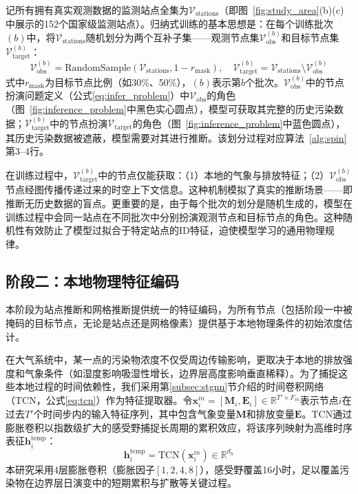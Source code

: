 记所有拥有真实观测数据的监测站点全集为$\mathcal{V}_{\text{stations}}$（即图~\ref{fig:study_area}(b)(c)中展示的152个国家级监测站点）。归纳式训练的基本思想是：在每个训练批次$(b)$中，将$\mathcal{V}_{\text{stations}}$随机划分为两个互补子集——观测节点集$\mathcal{V}_{\text{obs}}^{(b)}$和目标节点集$\mathcal{V}_{\text{target}}^{(b)}$：
\begin{equation}
\mathcal{V}_{\text{obs}}^{(b)} = \text{RandomSample}(\mathcal{V}_{\text{stations}}, 1 - r_{\text{mask}}), \quad \mathcal{V}_{\text{target}}^{(b)} = \mathcal{V}_{\text{stations}} \setminus \mathcal{V}_{\text{obs}}^{(b)}
\label{eq:inductive_sampling}
\end{equation}
\noindent 式中$r_{\text{mask}}$为目标节点比例（如30\%、50\%），$(b)$表示第$b$个批次。$\mathcal{V}_{\text{obs}}^{(b)}$中的节点扮演问题定义（公式\eqref{eq:infer_problem}）中$\mathcal{V}_{\text{obs}}$的角色（图~\ref{fig:inference_problem}中黑色实心圆点），模型可获取其完整的历史污染数据；$\mathcal{V}_{\text{target}}^{(b)}$中的节点扮演$\mathcal{V}_{\text{target}}$的角色（图~\ref{fig:inference_problem}中蓝色圆点），其历史污染数据被遮蔽，模型需要对其进行推断。该划分过程对应算法~\ref{alg:spin}第3--4行。

在训练过程中，$\mathcal{V}_{\text{target}}^{(b)}$中的节点仅能获取：（1）本地的气象与排放特征；（2）$\mathcal{V}_{\text{obs}}^{(b)}$节点经图传播传递过来的时空上下文信息。这种机制模拟了真实的推断场景——即推断无历史数据的盲点。更重要的是，由于每个批次的划分是随机生成的，模型在训练过程中会同一站点在不同批次中分别扮演观测节点和目标节点的角色。这种随机性有效防止了模型过拟合于特定站点的ID特征，迫使模型学习的通用物理规律。


\subsection{阶段二：本地物理特征编码}
\label{subsec:stage2_encoding}

本阶段为站点推断和网格推断提供统一的特征编码，为所有节点（包括阶段一中被掩码的目标节点，无论是站点还是网格像素）提供基于本地物理条件的初始浓度估计。

在大气系统中，某一点的污染物浓度不仅受周边传输影响，更取决于本地的排放强度和气象条件（如湿度影响吸湿性增长，边界层高度影响垂直稀释）\citep{tai2010correlations}。为了捕捉这些本地过程的时间依赖性，我们采用第\ref{subsec:stgnn}节介绍的时间卷积网络（TCN，公式\eqref{eq:tcn}）作为特征提取器。令$\mathbf{x}_i^{in} = [\mathbf{M}_i, \mathbf{E}_i] \in \mathbb{R}^{T' \times F_{in}}$表示节点$i$在过去$T'$个时间步内的输入特征序列，其中包含气象变量$\mathbf{M}$和排放变量$\mathbf{E}$。TCN通过膨胀卷积以指数级扩大的感受野捕捉长周期的累积效应，将该序列映射为高维时序表征$\mathbf{h}_i^{\text{temp}}$：
\begin{equation}
    \mathbf{h}_i^{\text{temp}} = \text{TCN}(\mathbf{x}_i^{in}) \in \mathbb{R}^{d_h}
\label{eq:tcn_encoding}
\end{equation}
\noindent 本研究采用4层膨胀卷积（膨胀因子$[1, 2, 4, 8]$），感受野覆盖16小时，足以覆盖污染物在边界层日演变中的短期累积与扩散等关键过程。

